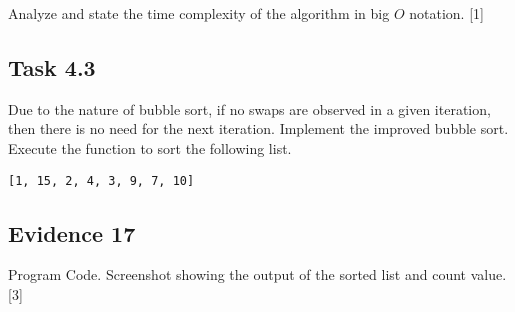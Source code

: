 Analyze and state the time complexity of the algorithm in big $O$
notation. \hfill{} {[}1{]}

\subsection*{Task 4.3}

Due to the nature of bubble sort, if no swaps are observed in a given
iteration, then there is no need for the next iteration. Implement
the improved bubble sort. Execute the function to sort the following
list.

\texttt{{[}1, 15, 2, 4, 3, 9, 7, 10{]}}

\subsection*{Evidence 17}

Program Code. Screenshot showing the output of the sorted list and
count value. \hfill{}{[}3{]}